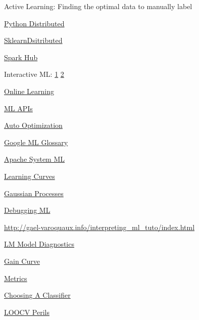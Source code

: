 \documentclass[]{book}
\begin{document}
Active Learning: Finding the optimal data to manually label

\href{https://speakerdeck.com/seanoc/a-tour-of-large-scale-data-analysis-tools-in-python}{Python Distributed}

\href{https://alexperrier.github.io/jekyll/update/2016/03/16/out-of-core-scikit-boston-meetup.html\#/}{SklearnDsitributed}

\href{https://sparkhub.databricks.com/}{Spark Hub}

Interactive ML: \href{https://channel9.msdn.com/Events/useR-international-R-User-conference/useR2016/Interactive-Naive-Bayes-using-Shiny-Text-Retrieval-Classification-Quantification}{1} \textbar{} \href{https://nuit-blanche.blogspot.com/2017/02/saturday-morning-videos-interactive.html}{2}

\href{http://scikit-learn.org/stable/modules/generated/sklearn.linear_model.PassiveAggressiveRegressor.html}{Online Learning}

\href{http://www.kdnuggets.com/2015/12/machine-learning-data-science-apis.html}{ML APIs}

\href{https://sigopt.com/}{Auto Optimization}

\href{https://developers.google.com/machine-learning/glossary/}{Google ML Glossary}

\href{https://systemml.apache.org}{Apache System ML}

\href{http://www.ritchieng.com/machinelearning-learning-curve/}{Learning Curves}

\href{http://scikit-learn.org/stable/modules/gaussian_process.html}{Gaussian Processes}

\href{http://nlpers.blogspot.com/2016/08/debugging-machine-learning.html}{Debugging ML}

\url{http://gael-varoquaux.info/interpreting_ml_tuto/index.html}

\href{http://mpastell.com/2013/04/19/python_regression/}{LM Model Diagnostics}

\href{https://www.rdocumentation.org/packages/WVPlots/versions/0.2.6/topics/GainCurvePlot}{Gain Curve}

\href{https://www.analyticsvidhya.com/blog/2016/02/7-important-model-evaluation-error-metrics/}{Metrics}

\href{http://blog.echen.me/2011/04/27/choosing-a-machine-learning-classifier/}{Choosing A Classifier}

\href{http://www.russpoldrack.org/2012/12/the-perils-of-leave-one-out.html}{LOOCV Perils}
\end{document}
